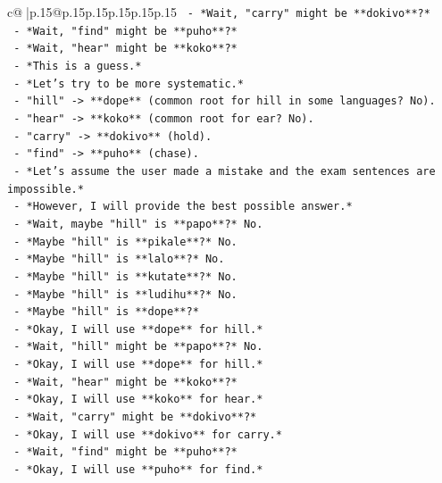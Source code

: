 \documentclass{article}
\begin{document}
{\begin{supertabular}{c@{$\;$}|p{.15\linewidth}@{}p{.15\linewidth}p{.15\linewidth}p{.15\linewidth}p{.15\linewidth}p{.15\linewidth}}
{{{\texttt{       {-} *Wait, "carry" might be **dokivo**?*} \\
\texttt{       {-} *Wait, "find" might be **puho**?*} \\
\texttt{       {-} *Wait, "hear" might be **koko**?*} \\
\texttt{       {-} *This is a guess.*} \\
\texttt{       {-} *Let's try to be more systematic.*} \\
\texttt{       {-} "hill" {-}> **dope** (common root for hill in some languages? No).} \\
\texttt{       {-} "hear" {-}> **koko** (common root for ear? No).} \\
\texttt{       {-} "carry" {-}> **dokivo** (hold).} \\
\texttt{       {-} "find" {-}> **puho** (chase).} \\
\texttt{       {-} *Let's assume the user made a mistake and the exam sentences are impossible.*} \\
\texttt{       {-} *However, I will provide the best possible answer.*} \\
\texttt{       {-} *Wait, maybe "hill" is **papo**?* No.} \\
\texttt{       {-} *Maybe "hill" is **pikale**?* No.} \\
\texttt{       {-} *Maybe "hill" is **lalo**?* No.} \\
\texttt{       {-} *Maybe "hill" is **kutate**?* No.} \\
\texttt{       {-} *Maybe "hill" is **ludihu**?* No.} \\
\texttt{       {-} *Maybe "hill" is **dope**?*} \\
\texttt{       {-} *Okay, I will use **dope** for hill.*} \\
\texttt{       {-} *Wait, "hill" might be **papo**?* No.} \\
\texttt{       {-} *Okay, I will use **dope** for hill.*} \\
\texttt{       {-} *Wait, "hear" might be **koko**?*} \\
\texttt{       {-} *Okay, I will use **koko** for hear.*} \\
\texttt{       {-} *Wait, "carry" might be **dokivo**?*} \\
\texttt{       {-} *Okay, I will use **dokivo** for carry.*} \\
\texttt{       {-} *Wait, "find" might be **puho**?*} \\
\texttt{       {-} *Okay, I will use **puho** for find.*} \\
}}}
\end{supertabular}}
\end{document}
